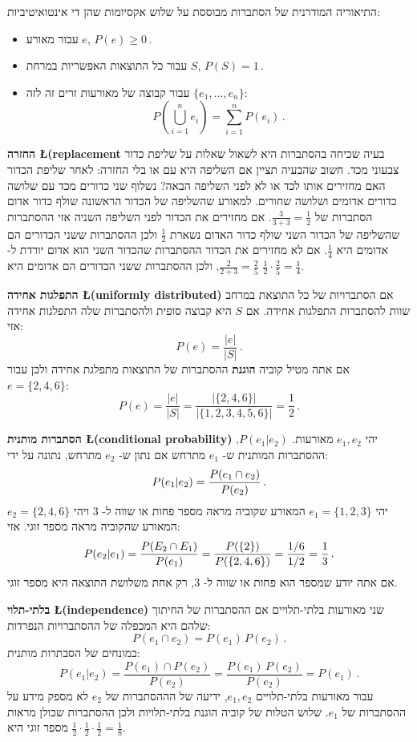 התיאוריה המודרנית של הסתברות מבוססת על שלוש אקסיומות שהן די אינטואיטיביות:
\begin{itemize}
\item 
עבור מאורע
$e$, $P(e) \geq 0\,$.\label{p.first-axiom}
\item 
עבור כל התוצאות האפשריות במרחת 
$S$, $P(S) = 1\,$.
\item
עבור קבוצה של מאורעות זרים זה לזה
$\{e_1,\ldots,e_n\}$:
\[
P\left(\bigcup_{i=1}^{n} e_i\right)=\sum_{i=1}^{n} P(e_i)\,.
\]
\end{itemize}

\textbf{החזרה \L{\small (replacement}}
בעיה שכיחה בהסתברות היא לשאול שאלות על שליפת כדור צבעוני מכד. חשוב שהבעיה תציין אם השליפה היא עם או בלי החזרה: לאחר שליפת הכדור האם מחזירים אותו לכד או לא לפני השליפה הבאה? נשלוף שני כדורים מכד עם שלושה כדורים אדומים ושלושה שחורים. למאורע שהשליפה של הכדור הראשונה שולף כדור אדום הסתברות של
$\frac{3}{3+3}=\frac{1}{2}$.
אם מחזירים את הכדור לפני השליפה השניה אזי ההסתברות שהשליפה של הכדור השני שולף כדור האדום נשארת 
$\frac{1}{2}$
ולכן ההסתברות ששני הכדורים הם אדומים היא
$\frac{1}{4}$.
אם לא מחזירים את הכדור ההסתברות שהכדור השני הוא אדום יורדת ל-%
$\frac{2}{2+3}=\frac{2}{5}$,
ולכן ההסתברות ששני הכדורים הם אדומים היא
$\frac{1}{2}\cdot\frac{2}{5}=\frac{1}{4}$.

\textbf{התפלגות אחידה \L{\small (uniformly distributed)}} 
אם הסתברויות של כל התוצאת במרחב שוות להסתברות התפלגות אחידה. אם 
$S$
היא קבוצה סופית ולהסתברות שלה התפלגות אחידה אזי:
\[
P(e)=\frac{|e|}{|S|}\,.
\]
אם אתה מטיל קוביה
\textbf{הוגנת}
ההסתברות של התוצאות מתפלגת אחידה ולכן עבור
$e=\{2,4,6\}$:
\[
P(e) = \frac{|e|}{|S|} = \frac{|\{2,4,6\}|}{|\{1,2,3,4,5,6\}|}=\frac{1}{2}\,.
\]

\textbf{הסתברות מותנית \L{\small (conditional probability)}} 
יהי 
$e_1,e_2$
מאורעות. 
$P(e_1 | e_2)$,
ההסתברות המותנית ש-%
$e_1$
מתרחש אם נתון ש-%
$e_2$
מתרחש, נתונה על ידי:
\[
P(e_1 | e_2) = \displaystyle\frac{P(e_1 \cap e_2)}{P(e_2)}\,.
\]
יהי 
$e_1=\{1,2,3\}$
המאורע שקוביה מראה מספר פחות או שווה ל-%
$3$
ויהי
$e_2=\{2,4,6\}$
המאורע שהקוביה מראה מספר זוגי. אזי:
\[
P(e_2 | e_1) = \displaystyle\frac{P(E_2 \cap E_1)}{P(e_1)}=\displaystyle\frac{P(\{2\})}{P(\{2,4,6\})}= \displaystyle\frac{1/6}{1/2}=\displaystyle\frac{1}{3}\,.
\]
אם אתה יודע שמספר הוא פחות או שווה ל-%
$3$,
רק אחת משלושת התוצאה היא מספר זוגי.

\textbf{בלתי-תלוי \L{\small (independence)}}
שני מאורעות בלתי-תלויים אם ההסתברות של החיתוך שלהם היא המכפלה של ההסתברויות הנפרדות:
\[
P(e_1 \cap e_2)=P(e_1)\,P(e_2)\,.
\]
במונחים של הסבתרות מותנית:
\[
P(e_1 | e_2)=\frac{P(e_1)\cap P(e_2)}{P(e_2)} = \frac{P(e_1)\,P(e_2)}{P(e_2)}=P(e_1)\,. 
\]
עבור מאורעות בלתי-תלויים
$e_1,e_2$,
ידיעה של הההסתברות של
$e_2$
לא מספק מידע על ההסתברות של
$e_1$.
שלוש הטלות של קוביה הוגנת בלתי-תלויות ולכן ההסתברות שכולן מראות מספר זוגי היא
$\frac{1}{2}\cdot \frac{1}{2}\cdot \frac{1}{2}=\frac{1}{8}$. 

